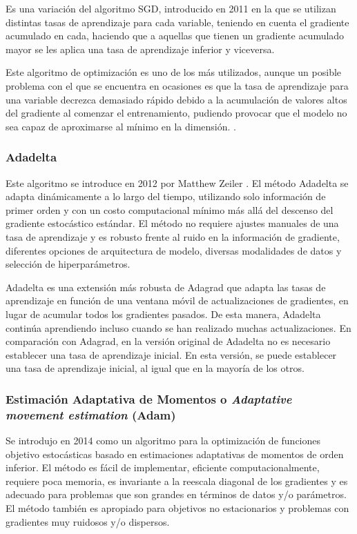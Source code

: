 \documentclass{report}
\begin{document}
Es una variación del algoritmo SGD, introducido en 2011 \cite{AdagradPaper} en la que se utilizan distintas tasas de aprendizaje para cada variable, teniendo en cuenta el gradiente acumulado en cada, haciendo que a aquellas que tienen un gradiente acumulado mayor se les aplica una tasa de aprendizaje inferior y viceversa.

Este algoritmo de optimización es uno de los más utilizados, aunque un posible problema con el que se encuentra en ocasiones es que la tasa de aprendizaje para una variable decrezca demasiado rápido debido a la acumulación de  valores altos del gradiente al comenzar el entrenamiento, pudiendo provocar que el modelo no sea capaz de aproximarse al mínimo en la dimensión. \cite{AdaGradArticulo}.


\subsubsection{Adadelta}


Este algoritmo se introduce en 2012 por Matthew Zeiler \cite{AdadeltaPaper}. El método Adadelta se adapta dinámicamente a lo largo del tiempo, utilizando solo información de primer orden y con un costo computacional mínimo más allá del descenso del gradiente estocástico estándar. El método no requiere ajustes manuales de una tasa de aprendizaje y es robusto frente al ruido en la información de gradiente, diferentes opciones de arquitectura de modelo, diversas modalidades de datos y selección de hiperparámetros.

Adadelta es una extensión más robusta de Adagrad que adapta las tasas de aprendizaje en función de una ventana móvil de actualizaciones de gradientes, en lugar de acumular todos los gradientes pasados. De esta manera, Adadelta continúa aprendiendo incluso cuando se han realizado muchas actualizaciones. En comparación con Adagrad, en la versión original de Adadelta no es necesario establecer una tasa de aprendizaje inicial. En esta versión, se puede establecer una tasa de aprendizaje inicial, al igual que en la mayoría de los otros.


\subsubsection{Estimación Adaptativa de Momentos o \textit{Adaptative movement estimation} (Adam) }


Se introdujo en 2014 \cite{AdamPaper} como un algoritmo para la optimización de funciones objetivo estocásticas basado en estimaciones adaptativas de momentos de orden inferior. El método es fácil de implementar, eficiente computacionalmente, requiere poca memoria, es invariante a la reescala diagonal de los gradientes y es adecuado para problemas que son grandes en términos de datos y/o parámetros. El método también es apropiado para objetivos no estacionarios y problemas con gradientes muy ruidosos y/o dispersos.
\end{document}
